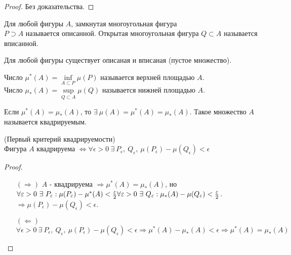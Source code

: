 \begin{proof}
    Без доказательства. %
\end{proof} 
\begin{definition}
    Для любой фигуры $A$, замкнутая многоугольная фигура\\
    $P\supset A$ называется описанной. Открытая многоугольная фигура $Q\subset A$ называется вписанной.
\end{definition} 
\begin{comm}
    Для любой фигуры существует описаная и вписаная (пустое множество).
\end{comm} 
\begin{definition}
    Число $\mu^*(A)=\inf\limits_{A\subset P}\mu(P)$ называется верхней площадью $A$.\\
    Число $\mu_*(A)=\sup\limits_{Q\subset A}\mu(Q)$ называется нижней площадью $A$.
\end{definition} 
\begin{definition}
    Если $\mu^*(A)=\mu_*(A)$, то $\exists\ \mu(A)=\mu^*(A)=\mu_*(A)$. Такое множество $A$ называется квадрируемым.
\end{definition} 
\begin{theorem}
    (Первый критерий квадрируемости)\\
    Фигура $A$ квадрируема $\Leftrightarrow \forall \epsilon>0\ \exists\ P_{\epsilon},\ Q_{\epsilon},\ \mu(P_{\epsilon})-\mu(Q_{\epsilon})<\epsilon$
\end{theorem} 
\begin{proof}
    \begin{itemize}
        \item[$(\Rightarrow)$] $A$ - квадрируема $\Rightarrow \mu^*(A)=\mu_*(A)$, но \\
        $\forall \epsilon>0\ \exists\ P_{\epsilon}: \mu(P_{\epsilon})-\mu^*(A)<\frac{\epsilon}{2}\\ 
        \forall \epsilon>0\ \exists\ Q_{\epsilon}: \mu_*(A)-\mu(Q_{\epsilon})<\frac{\epsilon}{2}$.
        $\Rightarrow \mu(P_\epsilon)-\mu(Q_{\epsilon})<\epsilon$.
        \item[$(\Leftarrow)$] $\forall \epsilon>0\ \exists\ P_{\epsilon},\ Q_{\epsilon},\ \mu(P_{\epsilon})-\mu(Q_{\epsilon})<\epsilon \Rightarrow \mu^*(A)-\mu_*(A)<\epsilon \Rightarrow \mu^*(A)=\mu_*(A)$
    \end{itemize}
\end{proof} 
